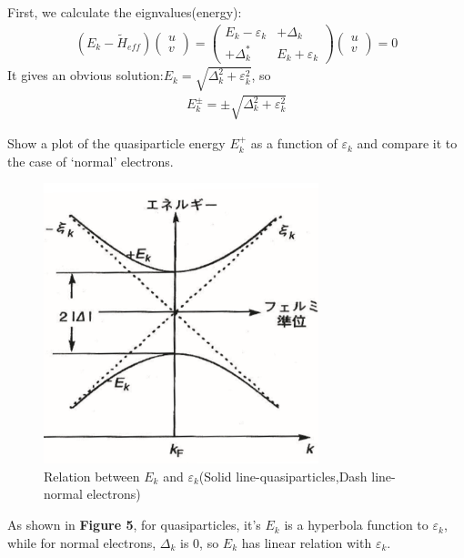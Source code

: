 \documentclass[answers]{exam}
\begin{document}
\begin{questions}
\begin{solution}
First, we calculate the eignvalues(energy):
\begin{align*}
\left(E_{k}-\tilde {H}_{eff}\right)\left(\begin{array}{c}
u \\
v
\end{array}\right)=\left(\begin{array}{cc}
E_{k}-\varepsilon_{k} & +\Delta_{k} \\
+\Delta_{k}^{*} & E_{k} +\varepsilon _{k}
\end{array}\right)\left(\begin{array}{c}
u \\
v
\end{array}\right)=0
\end{align*}
It gives an obvious solution:$E_{k}=\sqrt{\Delta_{k}^{2}+\varepsilon_{k}^{2}}$, so
\begin{align*}
E_{k}^{\pm}=\pm\sqrt{\Delta_{k}^{2}+\varepsilon_{k}^{2}}
\end{align*}
\end{solution}

\question Show a plot of the quasiparticle energy $E_{k}^{+}$ as a function of $\varepsilon_{k}$ and compare it
to the case of ‘normal’ electrons.
\begin{figure}[h]
\centering
\includegraphics[width=8cm]{Figure/6.png}
\caption{Relation between $E_{k}$ and $\varepsilon_{k}$(Solid line-quasiparticles,Dash line-normal electrons)}
\end{figure}
\begin{solution}
As shown in \textbf{Figure 5}, for quasiparticles, it's $E_{k}$ is a hyperbola function to $\varepsilon_{k}$, while for normal electrons, 
$\Delta_{k}$ is 0, so $E_{k}$ has linear relation with $\varepsilon_{k}$.
\end{solution}


\end{questions}
\end{document}
